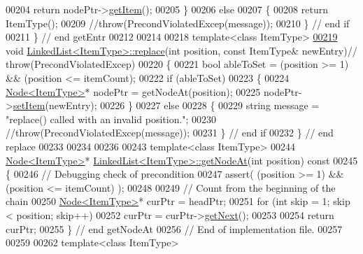 \begin{DoxyCode}
00204       \textcolor{keywordflow}{return} nodePtr->\hyperlink{classNode_a6c08caef312b6f2f69b5e090cf047514}{getItem}();
00205    \}
00206    \textcolor{keywordflow}{else}
00207    \{
00208        \textcolor{keywordflow}{return} ItemType();
00209        \textcolor{comment}{//throw(PrecondViolatedExcep(message)); }
00210    \}  \textcolor{comment}{// end if}
00211 \}  \textcolor{comment}{// end getEntr}
00212 
00214 
00218 \textcolor{keyword}{template}<\textcolor{keyword}{class} ItemType>
\hyperlink{classLinkedList_a3035f880c50e7d8f68e67c093d4607ca}{00219} \textcolor{keywordtype}{void} \hyperlink{classLinkedList_a3035f880c50e7d8f68e67c093d4607ca}{LinkedList<ItemType>::replace}(\textcolor{keywordtype}{int} position, \textcolor{keyword}{const} ItemType& newEntry)\textcolor{comment}{//
       throw(PrecondViolatedExcep)}
00220 \{
00221    \textcolor{keywordtype}{bool} ableToSet = (position >= 1) && (position <= itemCount);
00222    \textcolor{keywordflow}{if} (ableToSet)
00223    \{
00224       \hyperlink{classNode}{Node<ItemType>}* nodePtr = getNodeAt(position);
00225       nodePtr->\hyperlink{classNode_ab4ceecdecc5df799011de486b9f54974}{setItem}(newEntry);
00226    \}
00227    \textcolor{keywordflow}{else}
00228    \{
00229       \textcolor{keywordtype}{string} message = \textcolor{stringliteral}{"replace() called with an invalid position."};
00230       \textcolor{comment}{//throw(PrecondViolatedExcep(message)); }
00231    \}  \textcolor{comment}{// end if}
00232 \}  \textcolor{comment}{// end replace}
00233 
00234 
00236 
00243 \textcolor{keyword}{template}<\textcolor{keyword}{class} ItemType>
00244 \hyperlink{classNode}{Node<ItemType>}* \hyperlink{classLinkedList}{LinkedList<ItemType>::getNodeAt}(\textcolor{keywordtype}{int} position)\textcolor{keyword}{
       const}
00245 \textcolor{keyword}{}\{
00246    \textcolor{comment}{// Debugging check of precondition}
00247    assert( (position >= 1) && (position <= itemCount) );
00248    
00249    \textcolor{comment}{// Count from the beginning of the chain}
00250    \hyperlink{classNode}{Node<ItemType>}* curPtr = headPtr;
00251    \textcolor{keywordflow}{for} (\textcolor{keywordtype}{int} skip = 1; skip < position; skip++)
00252       curPtr = curPtr->\hyperlink{classNode_a3eb0c96e03a3fd46ea1cff4c305bbedd}{getNext}();
00253       
00254    \textcolor{keywordflow}{return} curPtr;
00255 \}  \textcolor{comment}{// end getNodeAt}
00256 \textcolor{comment}{//  End of implementation file.}
00257 
00259 
00262 \textcolor{keyword}{template}<\textcolor{keyword}{class} ItemType>

\end{DoxyCode}
